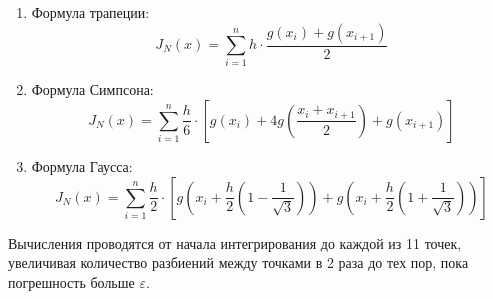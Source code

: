 \documentclass[14pt]{article}
\begin{document}
\begin{enumerate}
{\begin{enumerate}
{                }
            \item {
                Формула трапеции:
                \begin{equation}
                    J_N(x) = \displaystyle\sum_{i=1}^{n}h \cdot \displaystyle\frac{g(x_i)+g(x_{i+1})}{2}
                \end{equation}
                }
            \item {
                Формула Симпсона:
                \begin{equation}
                    J_N(x) = \displaystyle\sum_{i=1}^{n}\displaystyle\frac{h}{6} \cdot \left[g(x_i)+4g\left(
                        \displaystyle\frac{x_i + x_{i+1}}{2}
                    \right) + g(x_{i+1}) \right]
                \end{equation}
                }
            \item {
                Формула Гаусса:
                \begin{equation}
                    J_N(x) = \displaystyle\sum_{i=1}^{n}\displaystyle\frac{h}{2} \cdot \left[g\left(
                        x_i + \displaystyle\frac{h}{2}\left(1 - \displaystyle\frac{1}{\sqrt{3}} \right)
                    \right) +
                    g\left(
                        x_i + \displaystyle\frac{h}{2}\left(1 + \displaystyle\frac{1}{\sqrt{3}} \right)
                    \right)
                    \right]
                \end{equation}
                }
        \end{enumerate}
    }
\end{enumerate}

Вычисления проводятся от начала интегрирования до каждой из 11 точек, увеличивая количество разбиений между точками в 2 раза до тех пор, пока погрешность больше $\varepsilon$.
\newpage
\end{document}
